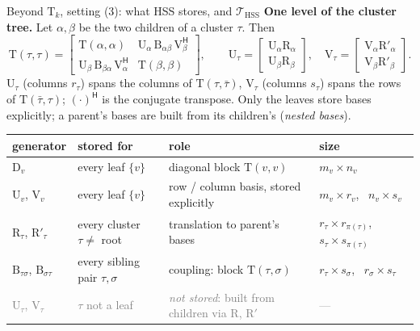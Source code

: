 \documentclass[aspectratio=169,11pt]{beamer}
\begin{document}
\begin{frame}{Beyond $\mathrm{T}_k$, setting (3): what HSS stores, and $\mathcal{T}_{\mathrm{HSS}}$}
\label{sl:set3}
\footnotesize
\textbf{One level of the cluster tree.} Let $\alpha,\beta$ be the two children of a cluster $\tau$. Then
\[
\mathrm{T}(\tau,\tau)=
\begin{bmatrix}
\mathrm{T}(\alpha,\alpha) & \mathrm{U}_\alpha\,\mathrm{B}_{\alpha\beta}\,\mathrm{V}_\beta^{\mathsf H}\\[2pt]
\mathrm{U}_\beta\,\mathrm{B}_{\beta\alpha}\,\mathrm{V}_\alpha^{\mathsf H} & \mathrm{T}(\beta,\beta)
\end{bmatrix},
\qquad
\mathrm{U}_\tau=\begin{bmatrix}\mathrm{U}_\alpha\mathrm{R}_\alpha\\ \mathrm{U}_\beta\mathrm{R}_\beta\end{bmatrix},\quad
\mathrm{V}_\tau=\begin{bmatrix}\mathrm{V}_\alpha\mathrm{R}'_\alpha\\ \mathrm{V}_\beta\mathrm{R}'_\beta\end{bmatrix}.
\]
$\mathrm{U}_\tau$ (columns $r_\tau$) spans the columns of $\mathrm{T}(\tau,\bar\tau)$, $\mathrm{V}_\tau$ (columns $s_\tau$)
spans the rows of $\mathrm{T}(\bar\tau,\tau)$; $(\cdot)^{\mathsf H}$ is the conjugate transpose. Only the leaves store
bases explicitly; a parent's bases are built from its children's (\emph{nested bases}).

\vspace{1mm}
\centering
\scriptsize
\renewcommand{\arraystretch}{1.1}
\begin{tabular}{@{}llll@{}}
\toprule
generator & stored for & role & size \\
\midrule
$\mathrm{D}_v$ & every leaf $\{v\}$ & diagonal block $\mathrm{T}(v,v)$ & $m_v\times n_v$ \\
$\mathrm{U}_v$, $\mathrm{V}_v$ & every leaf $\{v\}$ & row / column basis, stored explicitly & $m_v\times r_v$, \ $n_v\times s_v$ \\
$\mathrm{R}_\tau$, $\mathrm{R}'_\tau$ & every cluster $\tau\neq$ root & translation to parent's bases &
  $r_\tau\times r_{\pi(\tau)}$, \ $s_\tau\times s_{\pi(\tau)}$ \\
$\mathrm{B}_{\tau\sigma}$, $\mathrm{B}_{\sigma\tau}$ & every sibling pair $\tau,\sigma$ & coupling: block
  $\mathrm{T}(\tau,\sigma)$ & $r_\tau\times s_\sigma$, \ $r_\sigma\times s_\tau$ \\
\midrule
\textcolor{gray}{$\mathrm{U}_\tau$, $\mathrm{V}_\tau$} & \textcolor{gray}{$\tau$ not a leaf} &
  \textcolor{gray}{\emph{not stored}: built from children via $\mathrm{R}$, $\mathrm{R}'$} & \textcolor{gray}{---} \\
\bottomrule
\end{tabular}


\end{frame}
\end{document}
